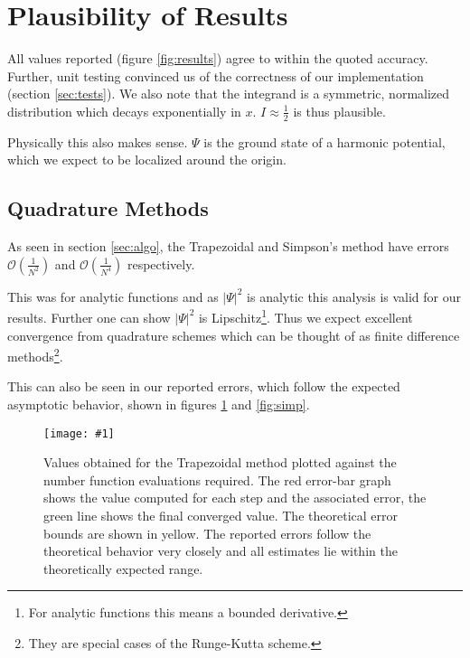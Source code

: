 \documentclass[10pt, a4paper]{article}
\newcommand{\plot}[3]{\begin{figure}[htp]\centering\texttt{[image: \#1]}\caption{#2}\label{#3}\end{figure}}
\begin{document}
\section{Plausibility of Results}
\label{sec:verify}


  All values reported (figure \ref{fig:results}) agree to within the quoted accuracy. Further, unit
  testing convinced us of the correctness of our implementation (section \ref{sec:tests}). We also note
  that the integrand is a symmetric, normalized distribution which decays exponentially in $x$.
  $I \approx \frac12$ is thus plausible.

  Physically this also makes sense. $\Psi$ is the ground state of a harmonic potential, which we expect
  to be localized around the origin.

  \subsection{Quadrature Methods}
  As seen in section \ref{sec:algo}, the Trapezoidal and Simpson's method have errors
  $\mathcal{O}\left( \frac{1}{N^2} \right)$ and $\mathcal{O}\left( \frac{1}{N^4} \right)$ respectively.

  This was for analytic functions and as $|\Psi|^2$ is analytic this analysis is valid
  for our results. Further one can show $|\Psi|^2$ is Lipschitz\footnote{For analytic functions this means
  a bounded derivative.}. Thus we expect excellent convergence
  from quadrature schemes which can be thought of as finite difference methods\footnote{They are special
  cases of the Runge-Kutta scheme\cite{nr}.}.

  This can also be seen in our reported errors, which follow the expected asymptotic behavior, shown in
  figures \ref{fig:trap} and \ref{fig:simp}.

  \plot{proj-trap-accuracy}{
    Values obtained for the Trapezoidal method plotted against the number function evaluations required. The red
    error-bar graph shows the value computed for each step and the associated error, the green line
    shows the final converged value. The theoretical error bounds are shown in yellow. The reported errors
    follow the theoretical behavior very closely and all estimates lie within the theoretically expected range.
  }{fig:trap}
\end{document}
